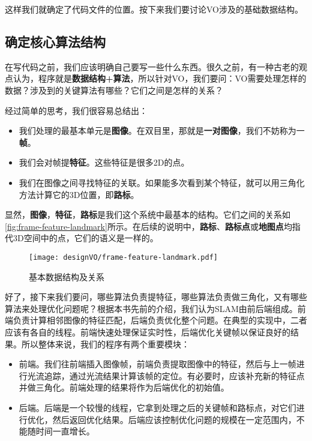这样我们就确定了代码文件的位置。按下来我们要讨论VO涉及的基础数据结构。

\subsection{确定核心算法结构}
在写代码之前，我们应该明确自己要写一些什么东西。很久之前，有一种古老的观点认为，程序就是\textbf{数据结构+算法}，所以针对VO，我们要问：VO需要处理怎样的数据？涉及到的关键算法有哪些？它们之间是怎样的关系？

经过简单的思考，我们很容易总结出：
\begin{itemize}
\item 我们处理的最基本单元是\textbf{图像}。在双目里，那就是\textbf{一对图像}，我们不妨称为一\textbf{帧}。
\item 我们会对帧提\textbf{特征}。这些特征是很多2D的点。
\item 我们在图像之间寻找特征的关联。如果能多次看到某个特征，就可以用三角化方法计算它的3D位置，即\textbf{路标}。
\end{itemize}

显然，\textbf{图像}，\textbf{特征}，\textbf{路标}是我们这个系统中最基本的结构。它们之间的关系如\autoref{fig:frame-feature-landmark}所示。在后续的说明中，\textbf{路标}、\textbf{路标点}或\textbf{地图点}均指代3D空间中的点，它们的语义是一样的。

\begin{figure}[!htp]
	\centering
	\texttt{[image: designVO/frame-feature-landmark.pdf]}
	\caption{基本数据结构及关系}
	\label{fig:frame-feature-landmark}
\end{figure}

好了，接下来我们要问，哪些算法负责提特征，哪些算法负责做三角化，又有哪些算法来处理优化问题呢？根据本书先前的介绍，我们认为SLAM由前后端组成。前端负责计算相邻图像的特征匹配，后端负责优化整个问题。在典型的实现中，二者应该有各自的线程。前端快速处理保证实时性，后端优化关键帧以保证良好的结果。所以整体来说，我们的程序有两个重要模块：

\begin{itemize}
\item 前端。我们往前端插入图像帧，前端负责提取图像中的特征，然后与上一帧进行光流追踪，通过光流结果计算该帧的定位。有必要时，应该补充新的特征点并做三角化。前端处理的结果将作为后端优化的初始值。
\item 后端。后端是一个较慢的线程，它拿到处理之后的关键帧和路标点，对它们进行优化，然后返回优化结果。后端应该控制优化问题的规模在一定范围内，不能随时间一直增长。
\end{itemize}

